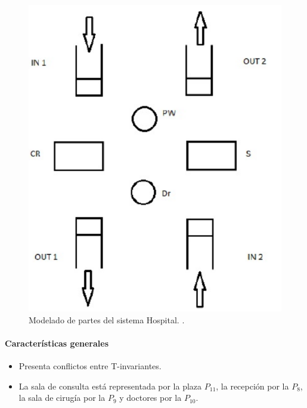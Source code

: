 \begin{itemize}
\begin{itemize}
\begin{itemize}
                    \begin{figure}[H]
                	\centering
                	\includegraphics[scale=0.6]{Figures/algoritmo3/hospitalmodelado.png}
                	\caption[Modelado de partes del sistema Hospital]{Modelado de partes del sistema Hospital. \footnotemark .}
                	\label{fig:onosdistribuido}
                 \end{figure}
                \end{itemize}
        \end{itemize}
\end{itemize}


\bigskip

\newpage
\paragraph{Características generales}
\hfill
\begin{itemize}
    \item Presenta conflictos entre T-invariantes.
    \item La sala de consulta está representada por la plaza $P_{11}$, la recepción por la $P_8$, la sala de cirugía por la $P_9$ y doctores por la $P_{10}$.
\end{itemize}

